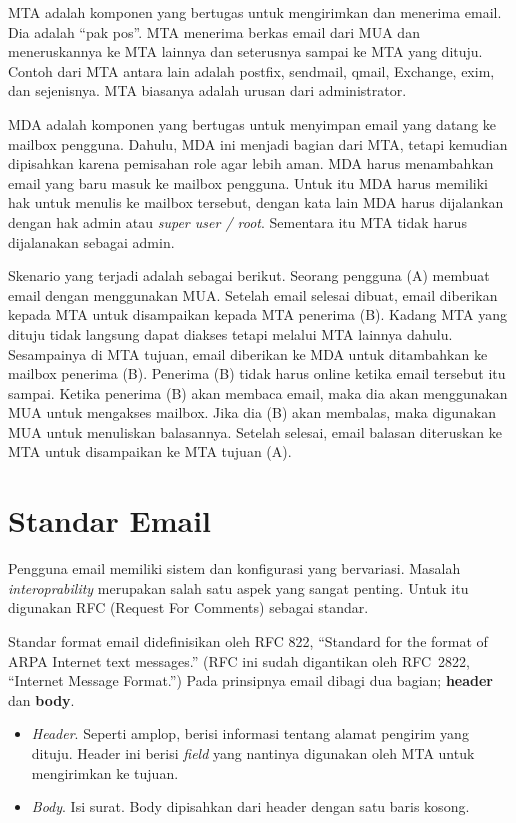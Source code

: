 MTA adalah komponen yang bertugas untuk mengirimkan dan menerima email. Dia
adalah ``pak pos''. MTA menerima berkas email dari MUA dan meneruskannya ke MTA
lainnya dan seterusnya sampai ke MTA yang dituju. Contoh dari MTA antara lain
adalah postfix, sendmail, qmail, Exchange, exim, dan sejenisnya. MTA biasanya
adalah urusan dari administrator.

MDA adalah komponen yang bertugas untuk menyimpan email yang datang ke mailbox
pengguna. Dahulu, MDA ini menjadi bagian dari MTA, tetapi kemudian dipisahkan
karena pemisahan role agar lebih aman. MDA harus menambahkan email yang baru
masuk ke mailbox pengguna. Untuk itu MDA harus memiliki hak untuk menulis ke
mailbox tersebut, dengan kata lain MDA harus dijalankan dengan hak admin atau
{\em super user / root}. Sementara itu MTA tidak harus dijalanakan sebagai admin.

Skenario yang terjadi adalah sebagai berikut. Seorang pengguna (A) membuat
email dengan menggunakan MUA. Setelah email selesai dibuat, email diberikan
kepada MTA untuk disampaikan kepada MTA penerima (B). Kadang MTA yang dituju
tidak langsung dapat diakses tetapi melalui MTA lainnya dahulu.  Sesampainya di
MTA tujuan, email diberikan ke MDA untuk ditambahkan ke mailbox penerima (B).
Penerima (B) tidak harus online ketika email tersebut itu sampai. Ketika
penerima (B) akan membaca email, maka dia akan menggunakan MUA untuk mengakses
mailbox. Jika dia (B) akan membalas, maka digunakan MUA untuk menuliskan
balasannya. Setelah selesai, email balasan diteruskan ke MTA untuk disampaikan
ke MTA tujuan (A).


\section{Standar Email}
Pengguna email memiliki sistem dan konfigurasi yang bervariasi. Masalah
{\em interoprability} merupakan salah satu aspek yang sangat penting. Untuk itu
digunakan RFC (Request For Comments) sebagai standar.

Standar format email didefinisikan oleh RFC 822, ``Standard for the format of 
ARPA Internet text messages.'' (RFC ini sudah digantikan oleh RFC~2822,
``Internet Message Format.'') Pada prinsipnya email dibagi dua bagian; {\bf
header} dan {\bf body}.

\begin{itemize}
   \item {\em Header}. Seperti amplop, berisi informasi tentang alamat pengirim
      yang dituju. Header ini berisi {\em field} yang nantinya digunakan oleh
      MTA untuk mengirimkan ke tujuan.
   \item {\em Body}. Isi surat. Body dipisahkan dari header dengan satu baris
      kosong. 
\end{itemize}

